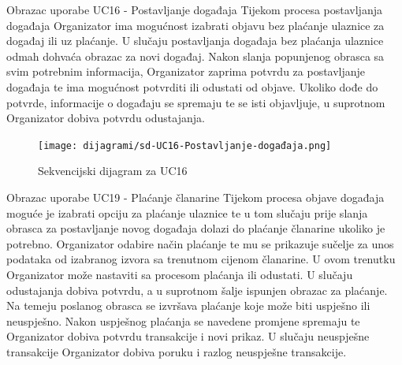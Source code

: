 				\LARGE {Obrazac uporabe UC16 - Postavljanje događaja}
				\newline
				\normalsize
				Tijekom procesa postavljanja događaja Organizator ima mogućnost izabrati objavu bez plaćanje ulaznice za događaj ili uz plaćanje. U slučaju postavljanja događaja bez plaćanja ulaznice odmah dohvaća obrazac za novi događaj. 
				Nakon slanja popunjenog obrasca sa svim potrebnim informacija, Organizator zaprima potvrdu za postavljanje događaja te ima mogućnost potvrditi ili odustati od objave. Ukoliko dođe do potvrde, informacije o događaju se spremaju te se isti objavljuje, u suprotnom Organizator dobiva potvrdu odustajanja.
				
				\begin{figure}[H]
					\texttt{[image: dijagrami/sd-UC16-Postavljanje-događaja.png]} %
					\centering
					\caption{Sekvencijski dijagram za UC16}
					\label{fig:promjene}
				\end{figure}
				\eject		
				
				\LARGE {Obrazac uporabe UC19 - Plaćanje članarine}
				\newline
				\normalsize
				Tijekom procesa objave događaja moguće je izabrati opciju za plaćanje ulaznice te u tom slučaju prije slanja obrasca za postavljanje novog događaja dolazi do plaćanje članarine ukoliko je potrebno. 
				Organizator odabire način plaćanje te mu se prikazuje sučelje za unos podataka od izabranog izvora sa trenutnom cijenom članarine. U ovom trenutku Organizator može nastaviti sa procesom plaćanja ili odustati. U slučaju odustajanja dobiva potvrdu, a u suprotnom šalje ispunjen obrazac za plaćanje. Na temeju poslanog obrasca se izvršava plaćanje koje može biti uspješno ili neuspješno. Nakon uspješnog plaćanja se navedene promjene spremaju te Organizator dobiva potvrdu transakcije i novi prikaz. U slučaju neuspješne transakcije Organizator dobiva poruku i razlog neuspješne transakcije.
				
